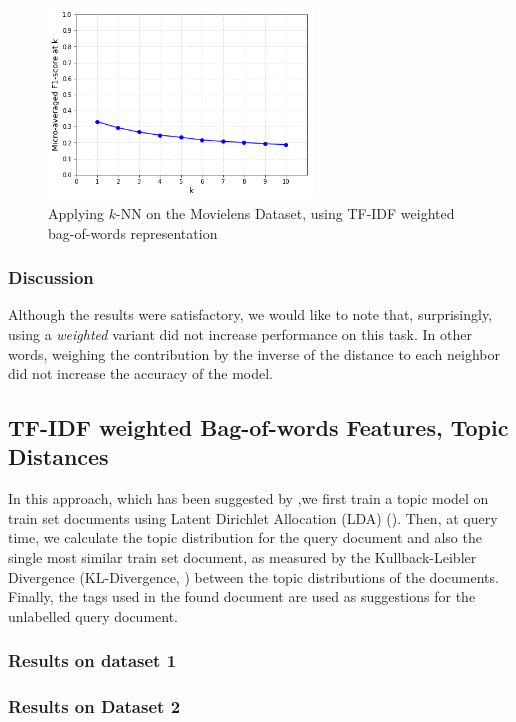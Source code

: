 \begin{figure}[H]
    \centering
    \includegraphics[width=7cm]{chapters/05_experiments/images/knn-tfidf-movielens.png}
    \caption{Applying $k$-NN on the Movielens Dataset, using TF-IDF weighted bag-of-words representation}
    \label{fig:knn__movielens}
\end{figure}

\subsubsection{Discussion}

Although the results were satisfactory, we would like to note that, surprisingly, using a \textit{weighted} variant did not increase performance on this task. In other words, weighing the contribution by the inverse of the distance to each neighbor did not increase the accuracy of the model.

\subsection{TF-IDF weighted Bag-of-words Features, Topic Distances}

In this approach, which has been suggested by \cite{choubey_2011},we first train a topic model on train set documents using Latent Dirichlet Allocation (LDA) (\cite{blei_etal_2003}). Then, at query time, we calculate the topic distribution for the query document and also the single most similar train set document, as measured by the Kullback-Leibler Divergence (KL-Divergence, \cite{kullback_leibler_1951}) between the topic distributions of the documents. Finally, the tags used in the found document are used as suggestions for the unlabelled query document.

\subsubsection{Results on dataset 1}

\subsubsection{Results on Dataset 2}

